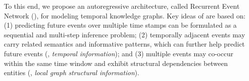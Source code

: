 



To this end, we propose an autoregressive architecture, called Recurrent Event Network (\method), for modeling temporal knowledge graphs.
Key ideas of \method are based on:
(1) predicting future events over multiple time stamps can be formulated as a sequential and multi-step inference problem;
(2) temporally adjacent events may carry related semantics and informative patterns, which can further help predict future events (\ie, \textit{temporal information}); 
and (3) multiple events may co-occur within the same time window and exhibit structural dependencies between entities (\ie, \textit{local graph structural information}).

